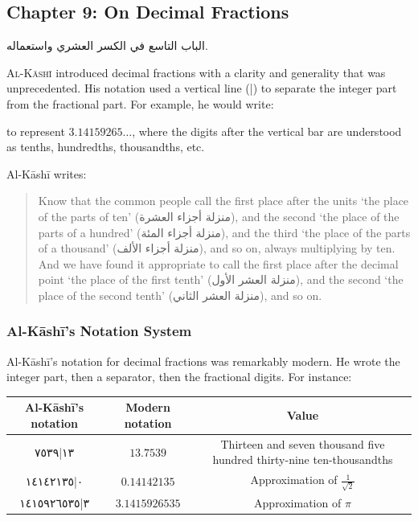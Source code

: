 \documentclass[11pt,a4paper]{article}
\newenvironment{arabicbox}{%
  \begin{framed}
  \begin{minipage}{\dimexpr\linewidth-2\fboxsep-2\fboxrule\relax}
  \setlength{\parindent}{0pt}
  \linespread{1.3}\selectfont
}{%
  \end{minipage}
  \end{framed}
}
\newcommand{\ar}[1]{{\arabicfont\beginR #1\endR}}
\begin{document}
\subsection{Chapter 9: On Decimal Fractions}

\begin{arabicbox}
\begin{Arabic}
الباب التاسع في الكسر العشري واستعماله.
\end{Arabic}
\end{arabicbox}

\vspace{0.3cm}

\lettrine[lines=3, nindent=0em, findent=3pt]{\color{chapcolor}A}{l-K\=ash\=i}
introduced decimal fractions with a clarity and generality that was
unprecedented. His notation used a vertical line (\ar{|}) to separate
the integer part from the fractional part. For example, he would write:

\begin{center}
\end{center}

\noindent to represent $3.14159265\ldots$, where the digits after the
vertical bar are understood as tenths, hundredths, thousandths, etc.

Al-K\=ash\=i writes:

\begin{quote}
Know that the common people call the first place after the units `the
place of the parts of ten' (\ar{منزلة أجزاء العشرة}), and the second
`the place of the parts of a hundred' (\ar{منزلة أجزاء المئة}), and
the third `the place of the parts of a thousand'
(\ar{منزلة أجزاء الألف}), and so on, always multiplying by ten. And
we have found it appropriate to call the first place after the decimal
point `the place of the first tenth' (\ar{منزلة العشر الأول}), and
the second `the place of the second tenth'
(\ar{منزلة العشر الثاني}), and so on.
\end{quote}

\subsubsection{Al-K\=ash\=i's Notation System}

Al-K\=ash\=i's notation for decimal fractions was remarkably modern. He
wrote the integer part, then a separator, then the fractional digits.
For instance:

\begin{center}
\begin{tabular}{|c|c|c|}
\hline
\textbf{Al-K\=ash\=i's notation} & \textbf{Modern notation} & \textbf{Value} \\
\hline
\ar{١٣|٧٥٣٩} & $13.7539$ & Thirteen and seven thousand five
hundred thirty-nine ten-thousandths \\
\hline
\ar{٠|١٤١٤٢١٣٥} & $0.14142135$ & Approximation of
$\frac{1}{\sqrt{2}}$ \\
\hline
\ar{٣|١٤١٥٩٢٦٥٣٥} & $3.1415926535$ & Approximation of $\pi$ \\
\hline
\end{tabular}
\end{center}
\end{document}
